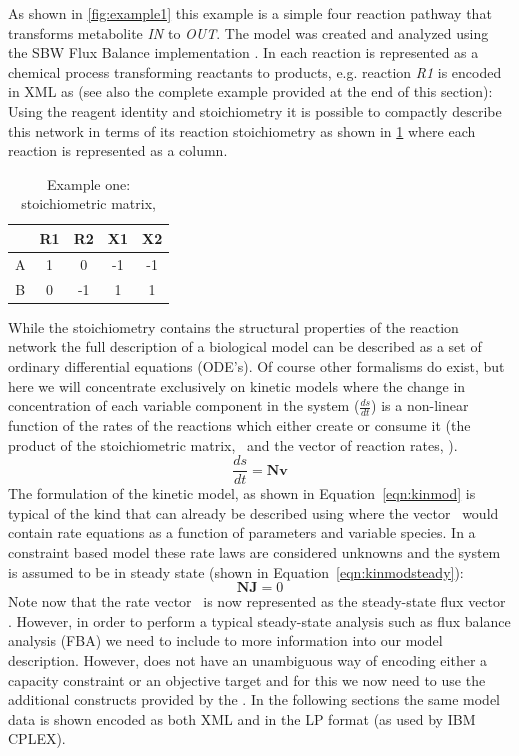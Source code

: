 As shown in \ref{fig:example1} this example is a simple four reaction
pathway that transforms metabolite \textit{IN} to \textit{OUT}. The model was created and analyzed using the \textsf{SBW Flux Balance} \FBC implementation \cite{sbw}. In \SBML each reaction is represented as a chemical process transforming reactants to products, e.g. reaction \textit{R1} is encoded in XML as (see also the complete example provided at the end of this section):
%
%
Using the reagent identity and stoichiometry it is possible to compactly describe this network in terms of its reaction stoichiometry as shown in \ref{tble:ex1nmat} where each reaction is represented as a column.
\begin{table}[h]
  \centering
    \begin{tabular}{c|cccc}
          & R1 & R2 & X1 & X2 \\ \hline
        A & 1 &  0 & -1 & -1 \\
        B & 0 & -1 &  1 &  1 \\
    \end{tabular}
  \caption{Example one: stoichiometric matrix, \Nmat}
  \label{tble:ex1nmat}
\end{table}
%
While the stoichiometry contains the structural properties of the reaction network the full description of a biological model can be described as a set of ordinary differential equations (ODE's). Of course other formalisms do exist, but here we will concentrate exclusively on kinetic models where the change in concentration of each variable component in the system ($\frac{ds}{dt}$) is a non-linear function of the rates of the reactions which either create or consume it (the product of the stoichiometric matrix, \Nmat\ and the vector of reaction rates, \vvec).
%
\begin{equation}\label{eqn:kinmod}
  \frac{ds}{dt} = \textbf{Nv}
\end{equation}
%
The formulation of the kinetic model, as shown in Equation~\ref{eqn:kinmod}
is typical of the kind that can already be described using \sbmlthreecore
where the vector \vvec\ would contain rate equations as a function of
parameters and variable species. In a constraint based model these rate laws are considered unknowns and the system is assumed to be in steady state (shown in Equation~\ref{eqn:kinmodsteady}):
%
\begin{equation}\label{eqn:kinmodsteady}
  \textbf{NJ} = 0
\end{equation}
%
Note now that the rate vector \vvec\ is now represented as the steady-state flux vector \Jvec. However, in order to perform a typical steady-state analysis such as flux balance analysis (FBA) we need to include to more  information into our model description. However, \sbmlthreecore does not have an unambiguous way of encoding either a capacity constraint or an objective target and for this we now need to use the additional constructs provided by the \FBCPackage. In the following sections the same model data is shown encoded as both XML and in the LP format (as used by IBM CPLEX).

